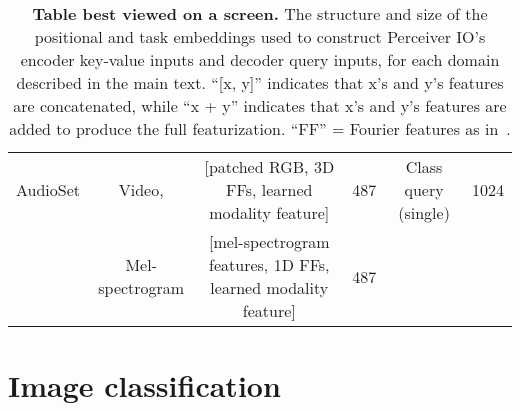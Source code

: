 \documentclass{article} \usepackage{iclr2022_conference,times}
\newcommand{\ourmodel}{Perceiver IO\xspace}
\begin{document}
\begin{table}[h]
{\begin{tabular}{c  c  c  c  c  c}
AudioSet & Video, & [patched RGB, 3D FFs, learned modality feature] & 487 & Class query (single) & 1024 \\
 & Mel-spectrogram & [mel-spectrogram features, 1D FFs, learned modality feature] & 487 &  &  \\
 \bottomrule
\end{tabular}}
\vspace{1mm}
\caption{\small \label{tab:pos_encodings_queries} \textbf{Table best viewed on a screen.} The structure and size of the positional and task embeddings used to construct \ourmodel{}'s encoder key-value inputs and decoder query inputs, for each domain described in the main text. ``[x, y]'' indicates that x's and y's features are concatenated, while ``x + y'' indicates that x's and y's features are added to produce the full featurization. ``FF'' = Fourier features as in~\cite{jaegle2021perceiver}.}
\end{table}

\section{Image classification}
\label{sec:imagenet}
\end{document}
